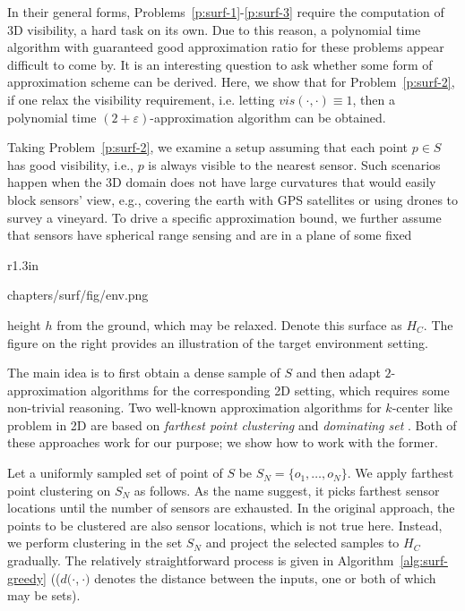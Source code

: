 
In their general forms, Problems~\ref{p:surf-1}-\ref{p:surf-3} require the computation of 3D visibility, a hard task on its own. Due to this reason, a polynomial time algorithm with guaranteed good approximation ratio for these problems appear difficult to come by. It is an interesting question to ask whether some form of approximation scheme can be derived. Here, we show that for Problem~\ref{p:surf-2}, if one relax the visibility requirement, i.e. letting $vis(\cdot, \cdot)\equiv 1$, then a polynomial time $(2+\varepsilon)$-approximation algorithm can be obtained. 

Taking Problem~\ref{p:surf-2}, we examine a setup assuming that each point $p \in S$ has good visibility, i.e., $p$ is always visible to the nearest sensor. Such scenarios happen when the 3D domain does not have large curvatures that would easily block sensors' view, e.g., covering the earth with GPS satellites or using drones to survey a vineyard. To drive a specific approximation bound, 
we further assume that sensors have spherical range sensing and are in a plane of some fixed 
\begin{wrapfigure}[5]{r}{1.3in}
  \vspace*{0mm}
  \begin{overpic}[width=1.3in,tics=5]{chapters/surf/fig/env.png}
	\end{overpic}
\vspace*{-6.5mm}
\end{wrapfigure}
height $h$ from the ground, which may be relaxed. Denote this surface as $H_C$. 
The figure on the right provides an illustration of the target environment setting. 

The main idea is to first obtain a dense sample of $S$ and then adapt $2$-approximation algorithms for the corresponding 2D setting, which requires some non-trivial reasoning. Two well-known approximation algorithms for $k$-center like problem in 2D are based on \emph{farthest point clustering} \cite{gonzalez1985clustering} and \emph{dominating set} \cite{hochbaum1985best, vazirani2013approximation}. Both of these approaches work for our purpose; we show how to work with the former.

Let a uniformly sampled set of point of $S$ be $S_N = \{o_1, \ldots, o_N\}$. We apply farthest point clustering \cite{gonzalez1985clustering} on $S_N$ as follows. As the name suggest, it picks farthest sensor locations until the number of sensors are exhausted. In the original approach, the points to be clustered are also sensor locations, which is not true here. Instead, we perform clustering in the set $S_N$ and project the selected samples to $H_C$ gradually. The relatively straightforward process is given in Algorithm~\ref{alg:surf-greedy} (($d(\cdot$,$\ \cdot)$ denotes the distance between the inputs, one or both of which may be sets).


